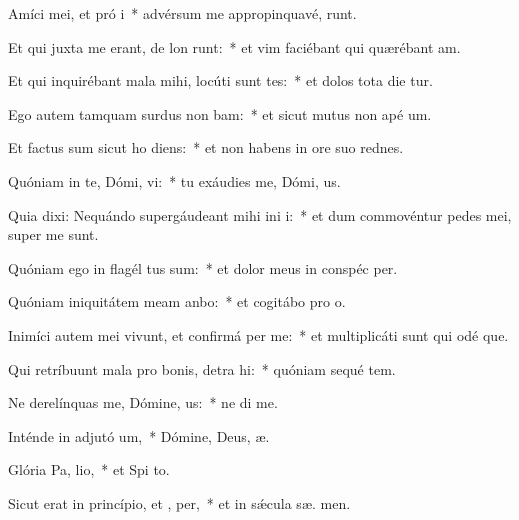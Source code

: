 \item Amíci mei, et pró i~* advérsum me appropinquavé,  runt.
\item Et qui juxta me erant, de lon runt:~* et vim faciébant qui quærébant  am.
\item Et qui inquirébant mala mihi, locúti sunt tes:~* et dolos tota die tur.
\item Ego autem tamquam surdus non bam:~* et sicut mutus non apé  um.
\item Et factus sum sicut ho  diens:~* et non habens in ore suo rednes.
\item Quóniam in te, Dómi, vi:~* tu exáudies me, Dómi,  us.
\item Quia dixi: Nequándo supergáudeant mihi ini i:~* et dum commovéntur pedes mei, super me   sunt.
\item Quóniam ego in flagél tus sum:~* et dolor meus in conspéc  per.
\item Quóniam iniquitátem meam anbo:~* et cogitábo pro  o.
\item Inimíci autem mei vivunt, et confirmá  per me:~* et multiplicáti sunt qui odé  que.
\item Qui retríbuunt mala pro bonis, detra hi:~* quóniam sequé tem.
\item Ne derelínquas me, Dómine,  us:~* ne di  me.
\item Inténde in adjutó um,~* Dómine, Deus,  æ.
\item Glória Pa,  lio,~* et Spi to.
\item Sicut erat in princípio, et ,  per,~* et in sǽcula sæ. men.
